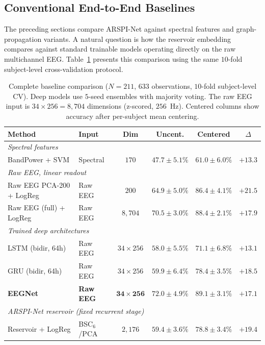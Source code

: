 \subsection{Conventional End-to-End Baselines}

The preceding sections compare ARSPI-Net against spectral features and graph-propagation variants. A natural question is how the reservoir embedding compares against standard trainable models operating directly on the raw multichannel EEG. Table~\ref{tab:conventional_baselines} presents this comparison using the same $10$-fold subject-level cross-validation protocol.

\begin{table}[t]
\centering
\caption{Complete baseline comparison ($N = 211$, $633$ observations, $10$-fold subject-level CV). Deep models use $5$-seed ensembles with majority voting. The raw EEG input is $34 \times 256 = 8{,}704$ dimensions (z-scored, $256$~Hz). Centered columns show accuracy after per-subject mean centering.}
\label{tab:conventional_baselines}
\small
\begin{tabular}{llcccc}
\hline
\textbf{Method} & \textbf{Input} & \textbf{Dim} & \textbf{Uncent.} & \textbf{Centered} & \textbf{$\Delta$} \\
\hline
\multicolumn{6}{l}{\textit{Spectral features}} \\
BandPower + SVM & Spectral & $170$ & $47.7 \pm 5.1\%$ & $61.0 \pm 6.0\%$ & $+13.3$ \\
\hline
\multicolumn{6}{l}{\textit{Raw EEG, linear readout}} \\
Raw EEG PCA-200 + LogReg & Raw EEG & $200$ & $64.9 \pm 5.0\%$ & $86.4 \pm 4.1\%$ & $+21.5$ \\
Raw EEG (full) + LogReg & Raw EEG & $8{,}704$ & $70.5 \pm 3.0\%$ & $88.4 \pm 2.1\%$ & $+17.9$ \\
\hline
\multicolumn{6}{l}{\textit{Trained deep architectures}} \\
LSTM (bidir, 64h) & Raw EEG & $34 \times 256$ & $58.0 \pm 5.5\%$ & $71.1 \pm 6.8\%$ & $+13.1$ \\
GRU (bidir, 64h) & Raw EEG & $34 \times 256$ & $59.9 \pm 6.4\%$ & $78.4 \pm 3.5\%$ & $+18.5$ \\
\textbf{EEGNet} & \textbf{Raw EEG} & $\mathbf{34 \times 256}$ & $\mathbf{72.0 \pm 4.9\%}$ & $\mathbf{89.1 \pm 3.1\%}$ & $\mathbf{+17.1}$ \\
\hline
\multicolumn{6}{l}{\textit{ARSPI-Net reservoir (fixed recurrent stage)}} \\
Reservoir + LogReg & BSC$_6$/PCA & $2{,}176$ & $59.4 \pm 3.6\%$ & $78.8 \pm 3.4\%$ & $+19.4$ \\
\hline
\end{tabular}
\end{table}

